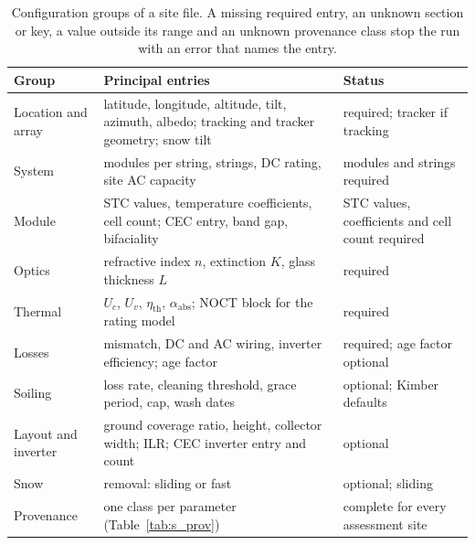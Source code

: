 \documentclass[11pt]{article}
\begin{document}
\begin{table}[htbp]
\centering
\caption{Configuration groups of a site file. A missing required entry, an unknown section or key, a value outside its range and an unknown provenance class stop the run with an error that names the entry.}
\label{tab:config}
\small
\begin{tabularx}{\textwidth}{>{\raggedright\arraybackslash}p{} >{\raggedright\arraybackslash}X >{\raggedright\arraybackslash}p{}}
\toprule
Group & Principal entries & Status \\
\midrule
Location and array & latitude, longitude, altitude, tilt, azimuth, albedo; tracking and tracker geometry; snow tilt & required; tracker if tracking \\
System & modules per string, strings, DC rating, site AC capacity & modules and strings required \\
Module & STC values, temperature coefficients, cell count; CEC entry, band gap, bifaciality & STC values, coefficients and cell count required \\
Optics & refractive index $n$, extinction $K$, glass thickness $L$ & required \\
Thermal & $U_c$, $U_v$, $\eta_{\mathrm{th}}$, $\alpha_{\mathrm{abs}}$; NOCT block for the rating model & required \\
Losses & mismatch, DC and AC wiring, inverter efficiency; age factor & required; age factor optional \\
Soiling & loss rate, cleaning threshold, grace period, cap, wash dates & optional; Kimber defaults \\
Layout and inverter & ground coverage ratio, height, collector width; ILR; CEC inverter entry and count & optional \\
Snow & removal: sliding or fast & optional; sliding \\
Provenance & one class per parameter (Table~\ref{tab:s_prov}) & complete for every assessment site \\
\bottomrule
\end{tabularx}
\end{table}
\end{document}
